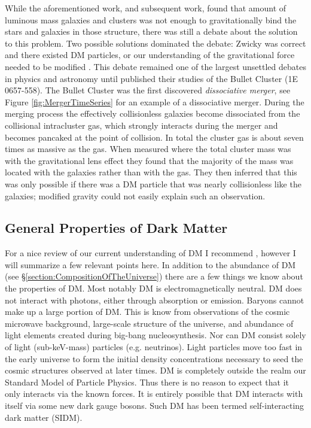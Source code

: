 While the aforementioned work, and subsequent work, found that amount of luminous mass galaxies and clusters was not enough to gravitationally bind the stars and galaxies in those structure, there was still a debate about the solution to this problem. 
Two possible solutions dominated the debate: Zwicky was correct and there existed DM particles, or our understanding of the gravitational force needed to be modified \citep[see][for a review]{Sanders:2002cc}.
This debate remained one of the largest unsettled debates in physics and astronomy until \citet{Clowe:2004eq} published their studies of the Bullet Cluster (1E 0657-558).
The Bullet Cluster was the first discovered \textit{dissociative merger}, see Figure \ref{fig:MergerTimeSeries} for an example of a dissociative merger.
During the merging process the effectively collisionless galaxies  become dissociated from the collisional intracluster gas, which strongly interacts during the merger and becomes pancaked at the point of collision.
In total the cluster gas is about seven times as massive as the gas.
When \citet{Clowe:2004eq} measured where the total cluster mass was with the gravitational lens effect they found that the majority of the mass was located with the galaxies rather than with the gas.
They then inferred that this was only possible if there was a DM particle that was nearly collisionless like the galaxies; modified gravity could not easily explain such an observation.

\subsection{General Properties of Dark Matter}

For a nice review of our current understanding of DM I recommend \citet{Peter:2012tg}, however I will summarize a few relevant points here.
In addition to the abundance of DM (see \S \ref{section:CompositionOfTheUniverse}) there are a few things we know about the properties of DM.
Most notably DM is electromagnetically neutral.
DM does not interact with photons, either through absorption or emission.
Baryons cannot make up a large portion of DM.
This is know from observations of the cosmic microwave background, large-scale structure of the universe, and abundance of light elements created during big-bang nucleosynthesis.
Nor can DM consist solely of light (sub-keV-mass) particles (e.g. neutrinos). 
Light particles move too fast in the early universe to form the initial density concentrations necessary to seed the cosmic structures observed at later times.
DM is completely outside the realm our Standard Model of Particle Physics.
Thus there is no reason to expect that it only interacts via the known forces.
It is entirely possible that DM interacts with itself via some new dark gauge bosons.
Such DM has been termed self-interacting dark matter (SIDM).

